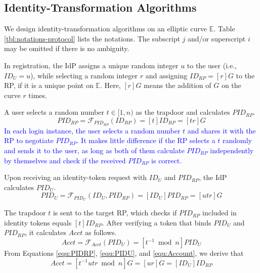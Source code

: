 
\subsection{Identity-Transformation Algorithms}
\label{subsec:overview}

We design identity-transformation algorithms %
on an elliptic curve $\mathbb{E}$.
Table \ref{tbl:notations-protocol} lists the notations. The subscript $j$ and/or superscript $i$ may be omitted if there is no ambiguity.

In registration, the IdP assigns a unique random integer $u$ to the user (i.e., $ID_U = u$), while selecting a random integer $r$ and assigning $ID_{RP} = [r]G$ to the RP, if it is a unique point on $\mathbb{E}$. Here, $[r]G$ means the addition of $G$ on the curve $r$ times.

 A user selects a random number $t \in [1, n)$ as the trapdoor and calculates $PID_{RP}$.
\begin{equation}
PID_{RP} = \mathcal{F}_{PID_{RP}}(ID_{RP}) = [t]{ID_{RP}} = [tr]G
\label{equ:PIDRP}
\end{equation}
\textcolor{blue}{In each login instance, the user selects a random number $t$ and shares it with the RP to negotiate $PID_{RP}$. It makes little difference if the RP selects a $t$ randomly and sends it to the user, as long as both of them calculate $PID_{RP}$ independently by themselves and check if the received $PID_{RP}$ is correct.}

Upon receiving an identity-token request with $ID_U$ and $PID_{RP}$, the IdP calculates $PID_{U}$.
\begin{equation}
PID_{U} = \mathcal{F}_{PID_U}(ID_U, PID_{RP}) =
  [{ID_U}]{PID_{RP}} = [utr]G
 \label{equ:PIDU}
\end{equation}


The trapdoor $t$ is sent to the target RP, which checks if $PID_{RP}$ included in identity tokens equals $[t]ID_{RP}$. After verifying a token that binds $PID_U$ and $PID_{RP}$, it calculates $Acct$ as follows.
\begin{equation}
Acct = \mathcal{F}_{Acct}(PID_{U})
   = [t^{-1} \bmod n]PID_{U}
   \label{equ:Account}
\end{equation}
From Equations \ref{equ:PIDRP}, \ref{equ:PIDU}, and \ref{equ:Account}, we derive that
\begin{equation*}
   Acct =  [t^{-1}utr \bmod n]G = [ur]G = [ID_U]ID_{RP}
   \label{equ:AccountNotChanged}
\end{equation*}

